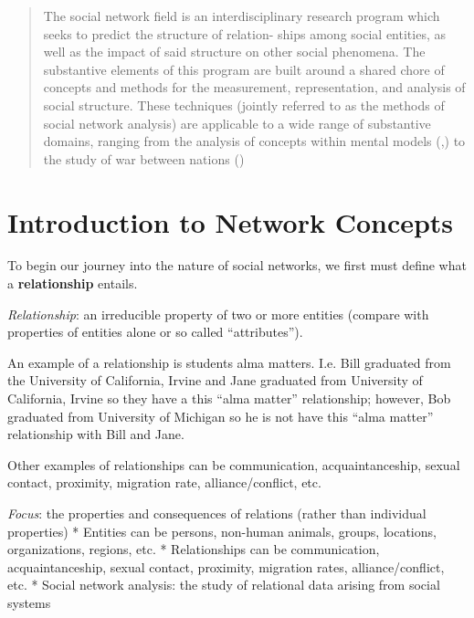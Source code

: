\documentclass[]{book}
\theoremstyle{definition}
\theoremstyle{definition}
\theoremstyle{definition}
\theoremstyle{remark}
\let\BeginKnitrBlock\begin \let\EndKnitrBlock\end
\begin{document}
\begin{quote}
The social network field is an interdisciplinary research program which
seeks to predict the structure of relation- ships among social entities,
as well as the impact of said structure on other social phenomena. The
substantive elements of this program are built around a shared chore of
concepts and methods for the measurement, representation, and analysis
of social structure. These techniques (jointly referred to as the
methods of social network analysis) are applicable to a wide range of
substantive domains, ranging from the analysis of concepts within mental
models (\citet{wegner95},\citet{carley97}) to the study of war between
nations (\citet{wimmer06})
\end{quote}

\section{Introduction to Network
Concepts}\label{introduction-to-network-concepts}

To begin our journey into the nature of social networks, we first must
define what a \textbf{relationship} entails.

\BeginKnitrBlock{definition}
\protect\hypertarget{def:unnamed-chunk-7}{}{\label{def:unnamed-chunk-7}
}\emph{Relationship}: an irreducible property of two or more entities
(compare with properties of entities alone or so called ``attributes'').
\EndKnitrBlock{definition}

\BeginKnitrBlock{example}
\protect\hypertarget{exm:unnamed-chunk-8}{}{\label{exm:unnamed-chunk-8} }An
example of a relationship is students alma matters. I.e. Bill graduated
from the University of California, Irvine and Jane graduated from
University of California, Irvine so they have a this ``alma matter''
relationship; however, Bob graduated from University of Michigan so he
is not have this ``alma matter'' relationship with Bill and Jane.

Other examples of relationships can be communication, acquaintanceship,
sexual contact, proximity, migration rate, alliance/conflict, etc.
\EndKnitrBlock{example}

\emph{Focus}: the properties and consequences of relations (rather than
individual properties) * Entities can be persons, non-human animals,
groups, locations, organizations, regions, etc. * Relationships can be
communication, acquaintanceship, sexual contact, proximity, migration
rates, alliance/conflict, etc. * Social network analysis: the study of
relational data arising from social systems
\end{document}
